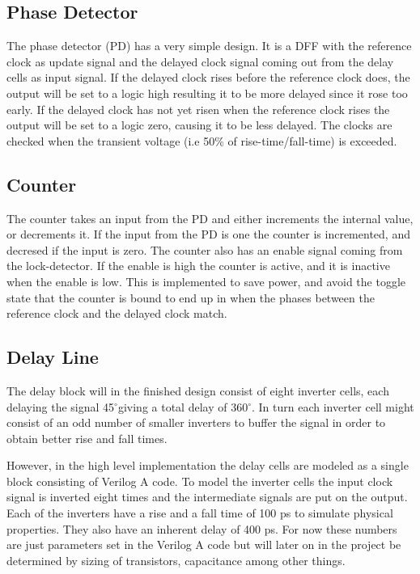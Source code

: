 \documentclass[a4paper,12pt]{article} \usepackage{graphicx}
\newcommand{\degree}{\ensuremath{^\circ}}
\begin{document}
\subsection{Phase Detector}
The phase detector (PD) has a very simple design. It is a DFF with the
reference clock as update signal and the delayed clock signal coming
out from the delay cells as input signal. If the delayed clock rises before
the reference clock does, the output will be set to a logic high resulting it to 
be more delayed since it rose too early. If the delayed clock has not yet risen 
when the reference clock rises the output will be set to a logic zero, causing 
it to be less delayed. The clocks are checked when the transient voltage (i.e 50\% 
of rise-time/fall-time) is exceeded.
 
\subsection{Counter}
The counter takes an input from the PD and either increments
the internal value, or decrements it. If the input from the PD is one the
counter is incremented, and decresed if the input is zero. The counter also has
an enable signal coming from the lock-detector. If the enable is high the counter
is active, and it is inactive when the enable is low. This is implemented to 
save power, and avoid the toggle state that the counter is bound to end up in when
the phases between the reference clock and the delayed clock match.


\subsection{Delay Line}
The delay block will in the finished design consist of eight inverter cells,
each delaying the signal 45\degree giving a total delay of 360\degree. In turn
each inverter cell might consist of an odd number of smaller inverters to buffer
the signal in order to obtain better rise and fall times.

However, in the high level implementation the delay cells are modeled
as a single block consisting of Verilog A code. To model the inverter
cells the input clock signal is inverted eight times and the intermediate
signals are put on the output. Each of the inverters have a rise and a
fall time of 100 ps to simulate physical properties. They also have an
inherent delay of 400 ps. For now these numbers are just parameters set
in the Verilog A code but will later on in the project be determined
by sizing of transistors, capacitance among other things.
\end{document}
